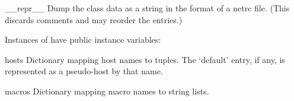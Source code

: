 \begin{methoddesc}{__repr__}{}
Dump the class data as a string in the format of a netrc file.
(This discards comments and may reorder the entries.)
\end{methoddesc}

Instances of  have public instance variables:

\begin{memberdesc}{hosts}
Dictionary mapping host names to  tuples.  The `default' entry, if any, is represented
as a pseudo-host by that name.
\end{memberdesc}

\begin{memberdesc}{macros}
Dictionary mapping macro names to string lists.
\end{memberdesc}


